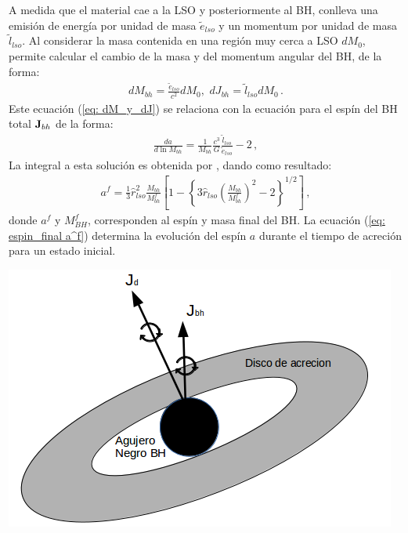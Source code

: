 A medida que el material cae a la LSO y posteriormente al BH, conlleva  una emisión de energía por unidad de masa $\widetilde{e}_{lso}$ y un momentum por unidad de masa $\widetilde{l}_{lso}$. Al considerar la masa contenida en una región muy cerca a LSO $dM_{0}$, permite calcular el cambio de la masa y del momentum angular del BH, de la forma:
%
\begin{align}
    dM_{bh}=\frac{\widetilde{e}_{lso}}{c^{2}}dM_{0}, \, \, dJ_{bh}=\widetilde{l}_{lso}dM_{0}\,.
    \label{eq: dM_y_dJ}
\end{align}
%
Este ecuación (\ref{eq: dM_y_dJ}) se relaciona con la ecuación para el espín del BH total ${\bf{J}}_{bh}$ de la forma:
%
\begin{align}
    \frac{da}{d\ln{M_{bh}}}=\frac{1}{M_{bh}}\frac{c^{3}}{G}\frac{\widetilde{l}_{lso}}{\widetilde{e}_{lso}}-2\,,
\end{align}
%
La integral a esta solución es obtenida por \cite{bardeen1970}, dando como resultado: 
\begin{align}
    a^{f}=\frac{1}{3}\hat{r}_{lso}^{2}\frac{M_{bh}}{M_{bh}^{f}}\left[1- \left\{3\hat{r}_{lso}\left(\frac{M_{bh}}{M^{f}_{bh}} \right)^{2}-2 \right\}^{1/2} \right]\,,
    \label{eq: espin_final a^f}
\end{align}
donde $a^{f}$ y $M_{BH}^{f}$, corresponden al espín y masa final del BH. La ecuación (\ref{eq: espin_final a^f}) determina la evolución del espín $a$ durante el tiempo de acreción para un estado inicial. 

\begin{center}
\includegraphics[scale=.35]{./figures/4_Modelo_Spin/Modelo_disco_bh.png}
\label{fig: desaliniamineto_bh_disco}
\end{center}

